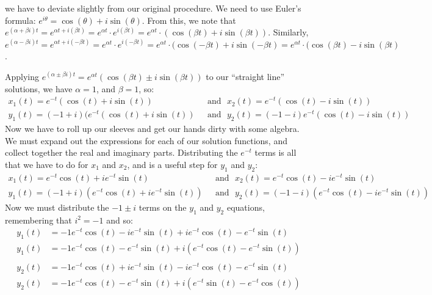  we have to deviate slightly from our original procedure.  We need to use Euler's formula: $e^{i\theta} = \cos(\theta) + i\sin(\theta)$.  From this, we note that $e^{(\alpha+\beta i)t} = e^{\alpha t + i(\beta t)} = e^{\alpha t} \cdot e^{i (\beta t)} = e^{\alpha t} \cdot (\cos(\beta t) + i \sin(\beta t))$.  Similarly, $e^{(\alpha - \beta i)t} = e^{\alpha t + i (-\beta t)} = e^{\alpha t} \cdot e^{i (-\beta t)} = e^{\alpha t}\cdot (\cos(-\beta t) + i\sin(-\beta t) = e^{\alpha t} \cdot (\cos(\beta t) - i\sin(\beta t)$.   

Applying $e^{(\alpha \pm \beta i)t} = e^{\alpha t} (\cos(\beta t) \pm i \sin (\beta t))$ to our ``straight line'' solutions, we have $\alpha =1$, and $\beta = 1$, so:
 \begin{align*}
x_1(t) = e^{-t}(\cos(t) + i\sin(t)) &\textrm{~~and~~} x_2(t) = e^{-t}(\cos(t) - i \sin(t))\\
y_1(t) = (-1+i)(e^{-t}(\cos(t) + i\sin(t)) &\textrm{~~and~~}  y_2(t) = (-1-i)e^{-t}(\cos(t) -i\sin(t))
\end{align*}
Now we have to roll up our sleeves and get our hands dirty with some algebra.  We must expand out the expressions for each of our solution functions, and collect together the real and imaginary parts.  
Distributing the $e^{-t}$ terms is all that we have to do for $x_1$ and $x_2$, and is a useful step for $y_1$ and $y_2$:
 \begin{align*}
x_1(t) = e^{-t}\cos(t) + i e^{-t}\sin(t) &\textrm{~~and~~} x_2(t) = e^{-t}\cos(t) - i e^{-t}\sin(t)\\
y_1(t) = (-1+i)(e^{-t}\cos(t) + ie^{-t}\sin(t)) &\textrm{~~and~~}  y_2(t) = (-1-i)(e^{-t}\cos(t) -ie^{-t}\sin(t))
\end{align*}
Now we must distribute the $-1\pm i$ terms on the $y_1$ and $y_2$ equations, remembering that $i^2 =-1$ and so:\\

\begin{align*}
y_1(t) &= -1e^{-t}\cos(t) -ie^{-t}\sin(t) + ie^{-t}\cos(t) -e^{-t}\sin(t)\\
y_1(t) &= -1e^{-t}\cos(t) - e^{-t}\sin(t) + i(e^{-t}\cos(t) - e^{-t}\sin(t))\\
\end{align*}
\begin{align*}
y_2(t) &= -1e^{-t}\cos(t) +ie^{-t}\sin(t) - ie^{-t}\cos(t) -e^{-t}\sin(t)\\
y_2(t) &= -1e^{-t}\cos(t) - e^{-t}\sin(t) + i(e^{-t}\sin(t) - e^{-t}\cos(t))\\
\end{align*}

